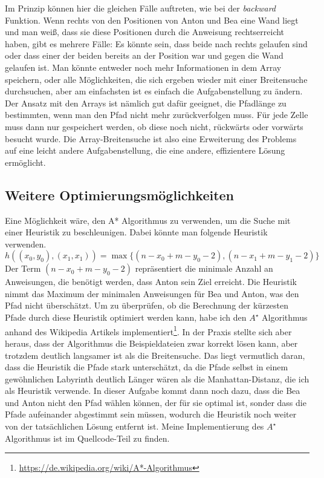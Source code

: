 \documentclass[a4paper,10pt,ngerman]{scrartcl}
\begin{document}
    Im Prinzip können hier die gleichen Fälle auftreten, wie bei der \textit{backward} Funktion.
    Wenn rechts von den Positionen von Anton und Bea eine Wand liegt und man weiß, dass sie diese Positionen durch die Anweisung \glqq rechts\grqq erreicht haben, gibt es mehrere Fälle:
    Es könnte sein, dass beide nach rechts gelaufen sind oder dass einer der beiden bereits an der Position war und gegen die Wand gelaufen ist.
    Man könnte entweder noch mehr Informationen in dem Array speichern, oder alle Möglichkeiten, die sich ergeben wieder mit einer Breitensuche durchsuchen, aber am einfachsten ist es einfach die Aufgabenstellung zu ändern.
    Der Ansatz mit den Arrays ist nämlich gut dafür geeignet, die Pfadlänge zu bestimmten, wenn man den Pfad nicht mehr zurückverfolgen muss.
    Für jede Zelle muss dann nur gespeichert werden, ob diese noch nicht, rückwärts oder vorwärts besucht wurde.
    Die Array-Breitensuche ist also eine Erweiterung des Problems auf eine leicht andere Aufgabenstellung, die eine andere, effizientere Lösung ermöglicht.

    \subsection{Weitere Optimierungsmöglichkeiten}
    Eine Möglichkeit wäre, den A* Algorithmus zu verwenden, um die Suche mit einer Heuristik zu beschleunigen.
    Dabei könnte man folgende Heuristik verwenden.
    \[h((x_0, y_0), (x_1, x_1)) = \max\{(n - x_0 + m - y_0 - 2), (n - x_1 + m - y_1 - 2)\}\]
    Der Term $(n - x_0 + m - y_0 - 2)$ repräsentiert die minimale Anzahl an Anweisungen, die benötigt werden, dass Anton sein Ziel erreicht.
    Die Heuristik nimmt das Maximum der minimalen Anweisungen für Bea und Anton, was den Pfad nicht überschätzt.
    Um zu überprüfen, ob die Berechnung der kürzesten Pfade durch diese Heuristik optimiert werden kann, habe ich den $A^\star$ Algorithmus anhand des Wikipedia Artikels implementiert\footnote{\url{https://de.wikipedia.org/wiki/A*-Algorithmus}}.
    In der Praxis stellte sich aber heraus, dass der Algorithmus die Beispieldateien zwar korrekt lösen kann, aber trotzdem deutlich langsamer ist als die Breitensuche.
    Das liegt vermutlich daran, dass die Heuristik die Pfade stark unterschätzt, da die Pfade selbst in einem gewöhnlichen Labyrinth deutlich Länger wären als die Manhattan-Distanz, die ich als Heuristik verwende.
    In dieser Aufgabe kommt dann noch dazu, dass die Bea und Anton nicht den Pfad wählen können, der für sie optimal ist, sonder dass die Pfade aufeinander abgestimmt sein müssen, wodurch die Heuristik noch weiter von der tatsächlichen Lösung entfernt ist.
    Meine Implementierung des $A^\star$ Algorithmus ist im Quellcode-Teil zu finden.
    \\
\end{document}
